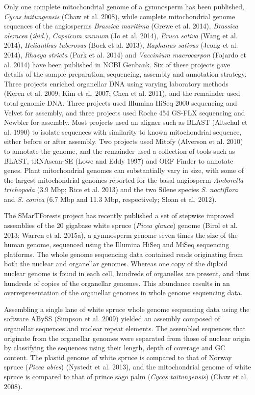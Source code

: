 \documentclass[
  12pt,
  oneside,
  openany]{book}
\begin{document}
Only one complete mitochondrial genome of a gymnosperm has been published, \emph{Cycas taitungensis} (Chaw et al. 2008), while complete mitochondrial genome sequences of the angiosperms \emph{Brassica maritima} (Grewe et al. 2014), \emph{Brassica oleracea} (\emph{ibid.}), \emph{Capsicum annuum} (Jo et al. 2014), \emph{Eruca sativa} (Wang et al. 2014), \emph{Helianthus tuberosus} (Bock et al. 2013), \emph{Raphanus sativus} (Jeong et al. 2014), \emph{Rhazya stricta} (Park et al. 2014) and \emph{Vaccinium macrocarpon} (Fajardo et al. 2014) have been published in NCBI Genbank. Six of these projects gave details of the sample preparation, sequencing, assembly and annotation strategy. Three projects enriched organellar DNA using varying laboratory methods (Keren et al. 2009; Kim et al. 2007; Chen et al. 2011), and the remainder used total genomic DNA. Three projects used Illumina HiSeq 2000 sequencing and Velvet for assembly, and three projects used Roche 454 GS-FLX sequencing and Newbler for assembly. Most projects used an aligner such as BLAST (Altschul et al. 1990) to isolate sequences with similarity to known mitochondrial sequence, either before or after assembly. Two projects used Mitofy (Alverson et al. 2010) to annotate the genome, and the remainder used a collection of tools such as BLAST, tRNAscan-SE (Lowe and Eddy 1997) and ORF Finder to annotate genes. Plant mitochondrial genomes can substantially vary in size, with some of the largest mitochondrial genomes reported for the basal angiosperm \emph{Amborella trichopoda} (3.9 Mbp; Rice et al. 2013) and the two Silene species \emph{S. noctiflora} and \emph{S. conica} (6.7 Mbp and 11.3 Mbp, respectively; Sloan et al. 2012).

The SMarTForests project has recently published a set of stepwise improved assemblies of the 20 gigabase white spruce (\emph{Picea glauca}) genome (Birol et al. 2013; Warren et al. 2015a), a gymnosperm genome seven times the size of the human genome, sequenced using the Illumina HiSeq and MiSeq sequencing platforms. The whole genome sequencing data contained reads originating from both the nuclear and organellar genomes. Whereas one copy of the diploid nuclear genome is found in each cell, hundreds of organelles are present, and thus hundreds of copies of the organellar genomes. This abundance results in an overrepresentation of the organellar genomes in whole genome sequencing data.

Assembling a single lane of white spruce whole genome sequencing data using the software ABySS (Simpson et al. 2009) yielded an assembly composed of organellar sequences and nuclear repeat elements. The assembled sequences that originate from the organellar genomes were separated from those of nuclear origin by classifying the sequences using their length, depth of coverage and GC content. The plastid genome of white spruce is compared to that of Norway spruce (\emph{Picea abies}) (Nystedt et al. 2013), and the mitochondrial genome of white spruce is compared to that of prince sago palm (\emph{Cycas taitungensis}) (Chaw et al. 2008).
\end{document}
